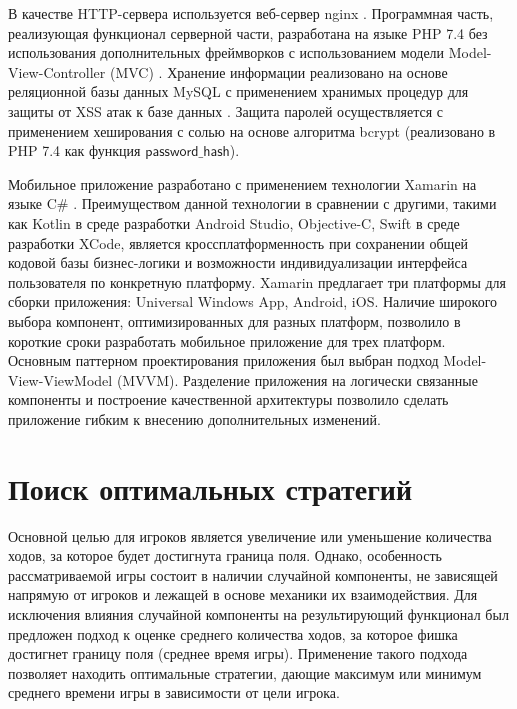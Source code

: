 
В качестве HTTP-сервера используется веб-сервер nginx \cite{reese_nginx_2008}. Программная часть, реализующая функционал серверной части, разработана на языке PHP 7.4 \cite{Nixon_web_2016} без использования дополнительных фреймворков с использованием модели Model-View-Controller (MVC) \cite{pitt_pro_2021}. Хранение информации реализовано на основе реляционной базы данных MySQL с применением хранимых процедур для защиты от XSS атак к базе данных \cite{stuttard_web_2011}. Защита паролей осуществляется с применением хеширования с солью на основе алгоритма bcrypt (реализовано в PHP 7.4 как функция $\mathsf{password\_hash}$).


Мобильное приложение разработано с применением технологии Xamarin на языке C$\mathsf{\#}$ \cite{sole_xamarin_2022}. Преимуществом данной технологии в сравнении с другими, такими как Kotlin в среде разработки Android Studio, Objective-C, Swift в среде разработки XCode, является кроссплатформенность при сохранении общей кодовой базы бизнес-логики и возможности индивидуализации интерфейса пользователя по конкретную платформу. Xamarin предлагает три платформы для сборки приложения: Universal Windows App, Android, iOS. Наличие широкого выбора компонент, оптимизированных для разных платформ, позволило в короткие сроки разработать мобильное приложение для трех платформ. Основным паттерном проектирования приложения был выбран подход Model-View-ViewModel (MVVM). Разделение приложения на логически связанные компоненты и построение качественной архитектуры позволило сделать приложение гибким к внесению дополнительных изменений.


\section{Поиск оптимальных стратегий}\label{sec:ch3/sec3}

Основной целью для игроков является увеличение или уменьшение количества ходов, за которое будет достигнута граница поля. Однако, особенность рассматриваемой игры состоит в наличии случайной компоненты, не зависящей напрямую от игроков и лежащей в основе механики их взаимодействия. Для исключения влияния случайной компоненты на результирующий функционал был предложен подход к оценке среднего количества ходов, за которое фишка достигнет границу поля (среднее время игры). Применение такого подхода позволяет находить оптимальные стратегии, дающие максимум или минимум среднего времени игры в зависимости от цели игрока.

